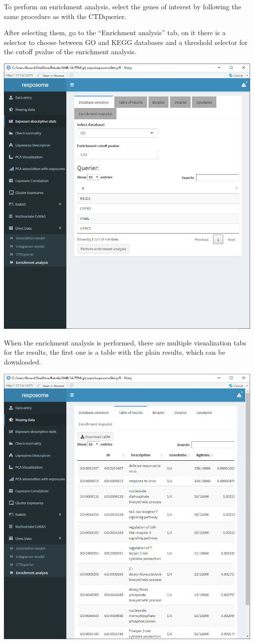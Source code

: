 \documentclass[
]{book}
\begin{document}
To perform an enrichment analysis, select the genes of interest by following the same procedure as with the CTDquerier.

After selecting them, go to the ``Enrichment analysis'' tab, on it there is a selector to choose between GO and KEGG databases and a threshold selector for the cutoff pvalue of the enrichment analysis.

\includegraphics{images/analysis11_1.png}

When the enrichment analysis is performed, there are multiple visualization tabs for the results, the first one is a table with the plain results, which can be downloaded.

\includegraphics{images/analysis11_2.png}
\end{document}
